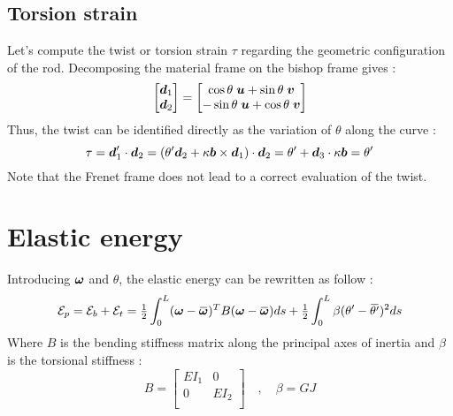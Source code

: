 \subsection{Torsion strain}
Let’s compute the twist or torsion strain $\tau$ regarding the geometric configuration of the rod. Decomposing the material frame on the bishop frame gives :
\begin{equation}
	\begin{bmatrix}
		\boldsymbol{d}_1\\
		\boldsymbol{d}_2\\
	\end{bmatrix} =
		\begin{bmatrix}
		\cos{\theta}\;\boldsymbol{u} + \sin{\theta}\;\boldsymbol{v}\\
		-\sin{\theta}\;\boldsymbol{u} + \cos{\theta}\;\boldsymbol{v}\\
	\end{bmatrix}
\end{equation}
Thus, the twist can be identified directly as the variation of $\theta$ along the curve :
\begin{equation}
	\tau = \boldsymbol{d}'_1 \cdot \boldsymbol{d}_2 = (\theta'\boldsymbol{d}_2 + \kappa\boldsymbol{b}\times\boldsymbol{d}_1)\cdot \boldsymbol{d}_2 = \theta' + \boldsymbol{d}_3\cdot\kappa\boldsymbol{b} = \theta'
\end{equation}
Note that the Frenet frame does not lead to a correct evaluation of the twist.

\section{Elastic energy}
Introducing $\boldsymbol{\omega}$ and $\theta$, the elastic energy can be rewritten as follow :
\begin{equation}
		\mathcal{E}_{p} = \mathcal{E}_{b} + \mathcal{E}_{t} = 
		\tfrac{1}{2} \int_{0}^{L} (\vect{\omega}-\overbar{\vect{\omega}})^T B (\vect{\omega}-\overbar{\vect{\omega}}) ds
		+ \tfrac{1}{2} \int_{0}^{L} \beta(\theta' -{\overbar{\theta'}})^2 ds
\end{equation}
Where $B$ is the bending stiffness matrix along the principal axes of inertia and $\beta$ is the torsional stiffness :
\begin{equation}
	B = \begin{bmatrix}
			EI_1	&	0\\
			0	&	EI_2\\
		\end{bmatrix}
	\quad,\quad
	\beta = GJ
\end{equation}

